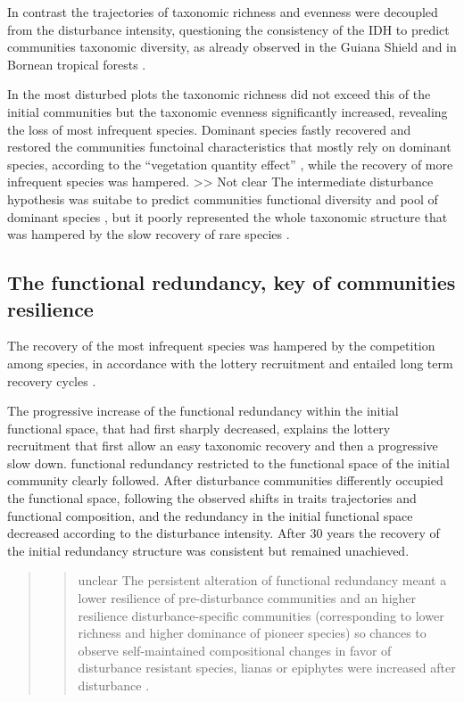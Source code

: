 \documentclass[fleqn,10pt]{ArtEcoFoG} %
\theoremstyle{definition}
\theoremstyle{definition}
\theoremstyle{definition}
\theoremstyle{remark}
\begin{document}
In contrast the trajectories of taxonomic richness and evenness were
decoupled from the disturbance intensity, questioning the consistency of
the IDH to predict communities taxonomic diversity, as already observed
in the Guiana Shield \citep{Baraloto2012a} and in Bornean tropical
forests \citep{Cannon1998}.

In the most disturbed plots the taxonomic richness did not exceed this
of the initial communities but the taxonomic evenness significantly
increased, revealing the loss of most infrequent species. Dominant
species fastly recovered and restored the communities functoinal
characteristics that mostly rely on dominant species, according to the
``vegetation quantity effect'' \citep{Grime1998}, while the recovery of
more infrequent species was hampered. \textgreater{}\textgreater{} Not
clear The intermediate disturbance hypothesis was suitabe to predict
communities functional diversity and pool of dominant species
\citep{Molino2001}, but it poorly represented the whole taxonomic
structure that was hampered by the slow recovery of rare species
\citep{Hubbell2001, Chave2004}.

\subsection{The functional redundancy, key of communities
resilience}\label{the-functional-redundancy-key-of-communities-resilience}

The recovery of the most infrequent species was hampered by the
competition among species, in accordance with the lottery recruitment
\citep{Busing2002} and entailed long term recovery cycles
\citep{Trenbath1999, Elmqvist2003, Diaz2005}.

The progressive increase of the functional redundancy within the initial
functional space, that had first sharply decreased, explains the lottery
recruitment that first allow an easy taxonomic recovery and then a
progressive slow down. functional redundancy restricted to the
functional space of the initial community clearly followed. After
disturbance communities differently occupied the functional space,
following the observed shifts in traits trajectories and functional
composition, and the redundancy in the initial functional space
decreased according to the disturbance intensity. After 30 years the
recovery of the initial redundancy structure was consistent but remained
unachieved.

\begin{quote}
\begin{quote}
unclear The persistent alteration of functional redundancy meant a lower
resilience of pre-disturbance communities and an higher resilience
disturbance-specific communities (corresponding to lower richness and
higher dominance of pioneer species) so chances to observe
self-maintained compositional changes in favor of disturbance resistant
species, lianas or epiphytes were increased after disturbance
\citep{Haddad2008, Burslem2000, Martin2013}.
\end{quote}
\end{quote}
\end{document}
